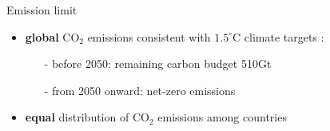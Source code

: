 \documentclass[11pt,aspectratio=169]{beamer}
\begin{document}
\addtocounter{framenumber}{-1}
\begin{frame}{Emission limit}
	\vspace{-1mm}
	\begin{itemize}
		\item  \textbf{global} CO$_2$ emissions consistent with $1.5^\circ$C climate targets \footnotesize{\citep{IPCC2022}}:
		\vspace{1mm}
		\begin{itemize}
			\item[-] before 2050: remaining carbon budget 510Gt
			\item[-] from 2050 onward: net-zero  emissions
		\end{itemize}
		\vspace{0mm}
		\item \normalsize{\textbf{equal} distribution of  CO$_2$ emissions among countries }
	\end{itemize}
	\vspace{-2mm}
	

\end{frame}
\end{document}
